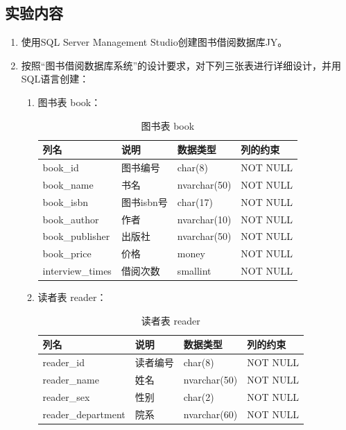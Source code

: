 \documentclass[a4paper]{article}
\begin{document}
\subsection{实验内容}

\begin{enumerate}
    \item 使用SQL Server Management Studio创建图书借阅数据库JY。
    \item 按照“图书借阅数据库系统”的设计要求，对下列三张表进行详细设计，并用SQL语言创建：
    
    \begin{enumerate}
        \item 图书表 book：
        
        \begin{table}[H]
        \centering
        \begin{tabular}{llll}
        \toprule
        列名 & 说明 & 数据类型 & 列的约束 \\
        \midrule
        book\_id & 图书编号 & char(8) & NOT NULL \\
        book\_name & 书名 & nvarchar(50) & NOT NULL \\
        book\_isbn & 图书isbn号 & char(17) & NOT NULL \\
        book\_author & 作者 & nvarchar(10) & NOT NULL \\
        book\_publisher & 出版社 & nvarchar(50) & NOT NULL \\
        book\_price & 价格 & money & NOT NULL \\
        interview\_times & 借阅次数 & smallint & NOT NULL \\
        \bottomrule
        \end{tabular}
        \caption{图书表 book}
        \end{table}

        \item 读者表 reader：
        
        \begin{table}[H]
        \centering
        \begin{tabular}{llll}
        \toprule
        列名 & 说明 & 数据类型 & 列的约束 \\
        \midrule
        reader\_id & 读者编号 & char(8) & NOT NULL \\
        reader\_name & 姓名 & nvarchar(50) & NOT NULL \\
        reader\_sex & 性别 & char(2) & NOT NULL \\
        reader\_department & 院系 & nvarchar(60) & NOT NULL \\
        \bottomrule
        \end{tabular}
        \caption{读者表 reader}
        \end{table}


\end{enumerate}
\end{enumerate}
\end{document}

